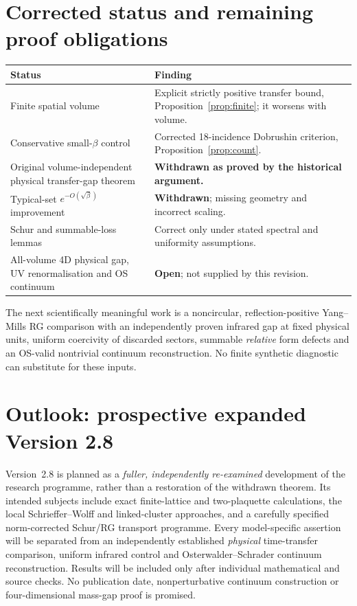 \documentclass[11pt,a4paper]{article}
\theoremstyle{remark}
\begin{document}
\section{Corrected status and remaining proof obligations}
\begin{center}\small
\begin{tabularx}{\textwidth}{@{}p{}Y@{}}
\toprule
Status & Finding\\
\midrule
Finite spatial volume & Explicit strictly positive transfer bound, Proposition~\ref{prop:finite}; it worsens with volume.\\
Conservative small-$\beta$ control & Corrected 18-incidence Dobrushin criterion, Proposition~\ref{prop:count}.\\
Original volume-independent physical transfer-gap theorem & \textbf{Withdrawn as proved by the historical argument.}\\
Typical-set $e^{-O(\sqrt\beta)}$ improvement & \textbf{Withdrawn}; missing geometry and incorrect scaling.\\
Schur and summable-loss lemmas & Correct only under stated spectral and uniformity assumptions.\\
All-volume 4D physical gap, UV renormalisation and OS continuum & \textbf{Open}; not supplied by this revision.\\
\bottomrule
\end{tabularx}
\end{center}
The next scientifically meaningful work is a
noncircular, reflection-positive Yang--Mills
RG comparison with an independently proven
infrared gap at fixed physical units, uniform
coercivity of discarded sectors, summable
\emph{relative} form defects and an OS-valid
nontrivial continuum reconstruction. No
finite synthetic diagnostic can substitute
for these inputs.

\section{Outlook: prospective expanded Version 2.8}
Version~2.8 is planned as a \emph{fuller, independently re-examined}
development of the research programme, rather than a restoration of
the withdrawn theorem. Its intended subjects include exact
finite-lattice and two-plaquette calculations, the local
Schrieffer--Wolff and linked-cluster approaches, and a carefully
specified norm-corrected Schur/RG transport programme. Every
model-specific assertion will be separated from an independently
established \emph{physical} time-transfer comparison, uniform
infrared control and Osterwalder--Schrader continuum reconstruction.
Results will be included only after individual mathematical and
source checks. No publication date, nonperturbative continuum
construction or four-dimensional mass-gap proof is promised.
\end{document}
